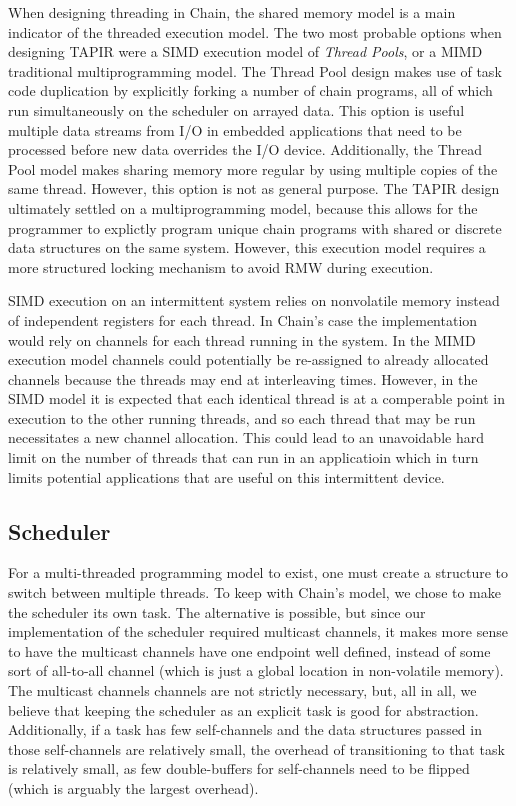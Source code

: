 \documentclass[11pt]{sensys-proc}
\newcommand{\chain}{Chain\xspace}
\begin{document}
When designing threading in Chain, the shared memory model is a main indicator 
of the threaded execution model. The two most probable options when designing 
TAPIR were a SIMD execution model of \textit{Thread Pools}, or a MIMD 
traditional multiprogramming model. The Thread Pool design makes use of task 
code duplication by explicitly forking a number of chain programs, all of which 
run simultaneously on the scheduler on arrayed data. This option is useful 
multiple data streams from I/O in embedded applications that need to be 
processed before new data overrides the I/O device. Additionally, the Thread 
Pool model makes sharing memory more regular by using multiple copies of the 
same thread. However, this option is not as general purpose. The TAPIR design 
ultimately settled on a multiprogramming model, because this allows for the 
programmer to explictly program unique chain programs with shared or discrete 
data structures on the same system. However, this execution model requires a
more structured locking mechanism to avoid RMW during execution. 

SIMD execution on an intermittent system relies on nonvolatile memory instead
of independent registers for each thread. In Chain's case the implementation
would rely on channels for each thread running in the system. In the MIMD
execution model channels could potentially be re-assigned to already allocated
channels because the threads may end at interleaving times. However, in the
SIMD model it is expected that each identical thread is at a comperable point
in execution to the other running threads, and so each thread that may be
run necessitates a new channel allocation. This could lead to an unavoidable
hard limit on the number of threads that can run in an applicatioin which in
turn limits potential applications that are useful on this intermittent device.


\subsection{Scheduler}
For a multi-threaded programming model to exist, one must create a structure to
switch between multiple threads. To keep with \chain's model, we chose to make
the scheduler its own task. The alternative is possible, but since our
implementation of the scheduler required multicast channels, it makes more
sense to have the multicast channels have one endpoint well defined, instead of
some sort of all-to-all channel (which is just a global location in
non-volatile memory). The multicast channels channels are not strictly
necessary, but, all in all, we believe that keeping the scheduler as an
explicit task is good for abstraction. Additionally, if a task has few
self-channels and the data structures passed in those self-channels are
relatively small, the overhead of transitioning to that task is relatively
small, as few double-buffers for self-channels need to be flipped (which is
arguably the largest overhead).
\end{document}
